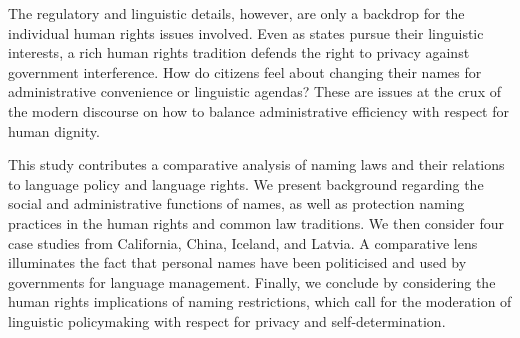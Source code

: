 The regulatory and linguistic details, however, are only a backdrop for the individual human rights issues involved. Even as states pursue their linguistic interests, a rich human rights tradition defends the right to privacy against government interference. How do citizens feel about changing their names for administrative convenience or linguistic agendas? These are issues at the crux of the modern discourse on how to balance administrative efficiency with respect for human dignity.

This study contributes a comparative analysis of naming laws and their relations to language policy and language rights. We present background regarding the social and administrative functions of names, as well as protection naming practices in the human rights and common law traditions. We then consider four case studies from California, China, Iceland, and Latvia. A comparative lens illuminates the fact that personal names have been politicised and used by governments for language management. Finally, we conclude by considering the human rights implications of naming restrictions, which call for the moderation of linguistic policymaking with respect for privacy and self-determination.
